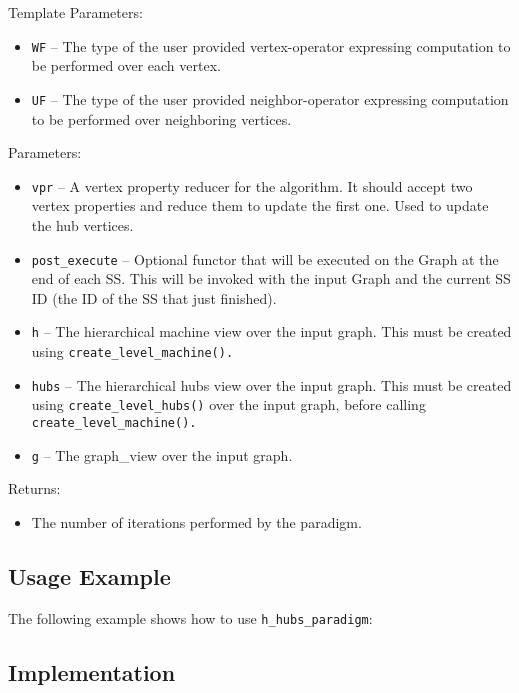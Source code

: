 Template Parameters:
\begin{itemize}
\item
\texttt{WF} --
The type of the user provided vertex-operator expressing computation to be performed over each vertex.
\item
\texttt{UF} --
The type of the user provided neighbor-operator expressing computation to be performed over neighboring vertices.
\end{itemize}

Parameters:
\begin{itemize}
\item
\texttt{vpr} --
A vertex property reducer for the algorithm. It should accept two vertex properties and reduce them to update the first one. Used to update the hub vertices.
\item
\texttt{post\_execute} --
Optional functor that will be executed on the Graph at the end of each SS. This will be invoked with the input Graph and the current SS ID (the ID of the SS that just finished).
\item
\texttt{h} --
The hierarchical machine view over the input graph. This must be created using 
\texttt{create\_level\_machine().}
\item
\texttt{hubs} --
The hierarchical hubs view over the input graph. This must be created using 
\texttt{create\_level\_hubs()} 
over the input graph, before calling 
\texttt{create\_level\_machine().}
\item
\texttt{g} --
The graph\_view over the input graph.
\end{itemize}

Returns:
\begin{itemize}
\item
The number of iterations performed by the paradigm. 
\end{itemize}

\subsection{Usage Example} \label{sec-hubs-para-alg-use}

The following example shows how to use 
\texttt{h\_hubs\_paradigm}:


\subsection{Implementation} \label{sec-hubs-para-alg-impl}

